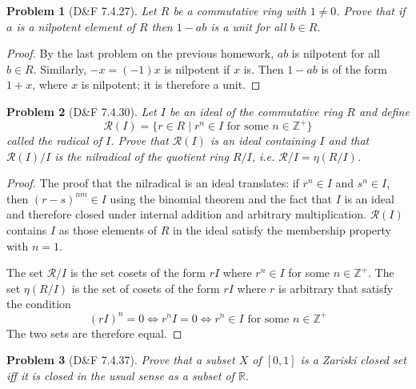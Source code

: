 \documentclass{article}
\newtheorem{plm}{Problem}
\begin{document}
\begin{plm}[D\&F 7.4.27]
  Let $R$ be a commutative ring with $1\neq 0 $. Prove that if $a$ is a nilpotent element of $R$ then $1-ab$ is a unit for all $b\in R$.
\end{plm}

\begin{proof}
  By the last problem on the previous homework, $ab$ is nilpotent for all $b \in R$.
  Similarly, $-x = (-1)x$ is nilpotent if $x$ is.
  Then $1 - ab$ is of the form $1 + x$, where $x$ is nilpotent; it is therefore a unit.
\end{proof}

\begin{plm}[D\&F 7.4.30]
  Let $I$ be an ideal of the commutative ring $R$ and define
  \[
    \mathcal{R}(I) = \{r \in R \mid r^{n} \in I \text{ for some } n \in \mathbb{Z}^{+}\}
  \]
  called the radical of $I$.
  Prove that $\mathcal{R}(I)$ is an ideal containing $I$ and that $\mathcal{R}(I) / I$ is the nilradical of the quotient ring $R / I$,
  i.e. $\mathcal{R}/I = \eta(R / I)$.
\end{plm}

\begin{proof}
  The proof that the nilradical is an ideal translates: if $r^{n} \in I$ and $s^{n} \in I$, then $(r - s)^{nm} \in I$ using the binomial theorem
  and the fact that $I$ is an ideal and therefore closed under internal addition and arbitrary multiplication.
  $\mathcal{R}(I)$ contains $I$ as those elements of $R$ in the ideal satisfy the membership property with $n = 1$.

  The set $\mathcal{R} / I$ is the set cosets of the form $rI$ where $r^{n} \in I$ for some $n \in \mathbb{Z}^{+}$.
  The set $\eta(R / I)$ is the set of cosets of the form $rI$ where $r$ is arbitrary that satisfy the condition
  \[
    (rI)^{n} = 0 \Leftrightarrow r^{n}I = 0 \Leftrightarrow r^{n} \in I \text{ for some } n \in \mathbb{Z}^{+}
  \]
  The two sets are therefore equal.
\end{proof}

\begin{plm}[D\&F 7.4.37]
  Prove that a subset $X$ of $[0,1]$ is a Zariski closed set iff it is closed in the usual sense as a subset of $\mathbb{R}$.
\end{plm}
\end{document}
